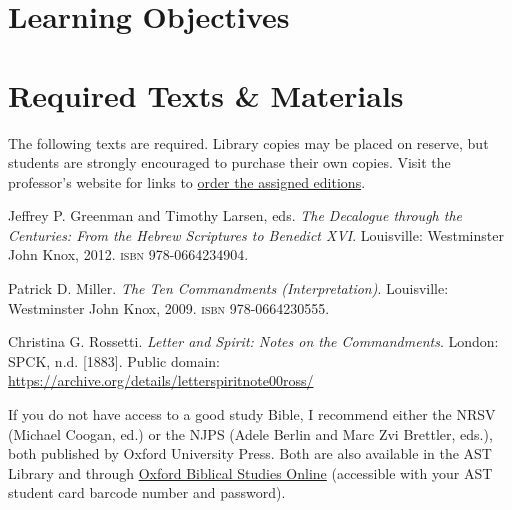 \documentclass[titlepage]{article}
\newcommand\incl{../includes}
\begin{document}


  \section{Learning Objectives}
  \label{objectives}

  \edobject

\section{Required Texts \& Materials}
\label{texts}

The following texts are required. Library copies may be placed on reserve, but students are strongly encouraged to purchase their own copies. Visit the professor's website for links to
\href{https://danieldriver.com/courses/hb-3113/}{order the assigned editions}.

\begingroup
\renewcommand{\section}[2]{}%
\begin{thebibliography}{Centuries}%

	 Jeffrey P. Greenman and Timothy Larsen, eds.
	\emph{The Decalogue through the Centuries: From the Hebrew Scriptures to Benedict XVI}.
	Louisville: Westminster John Knox, 2012.
	\textsc{isbn} 978-0664234904.

	 Patrick D. Miller.
    \emph{The Ten Commandments (Interpretation)}.
    Louisville: Westminster John Knox, 2009.
    \textsc{isbn} 978-0664230555.

	 Christina G. Rossetti.
	\emph{Letter and Spirit: Notes on the Commandments}.
	London: SPCK, n.d. [1883].
	Public domain: \url{https://archive.org/details/letterspiritnote00ross/}

\end{thebibliography}
\endgroup

If you do not have access to a good study Bible, I recommend either the
NRSV (Michael Coogan, ed.) or the NJPS (Adele Berlin and Marc Zvi
Brettler, eds.), both published by Oxford University Press. Both are also available in the AST Library and through \href{http://ezproxy.astheology.ns.ca:2048/login?url=http://www.oxfordbiblicalstudies.com/}{Oxford Biblical Studies Online} (accessible with your AST student card barcode number and password).
\end{document}
